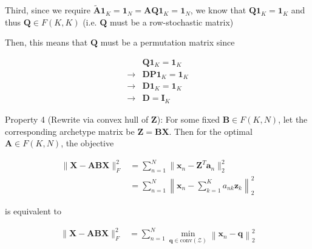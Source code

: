 \documentclass[oneside]{article}
\begin{document}
Third, since we require $\tilde{\mathbf{A}} \mathbf{1}_K = \mathbf{1}_N = \mathbf{A} \mathbf{Q} \mathbf{1}_K = \mathbf{1}_N$, we know that $\mathbf{Q} \mathbf{1}_K = \mathbf{1}_K$ and thus $\mathbf{Q} \in F(K, K)$ (i.e. $\mathbf{Q}$ must be a row-stochastic matrix)

Then, this means that $\mathbf{Q}$ must be a permutation matrix since 

\begin{equation}
    \begin{aligned}
        &\mathbf{Q} \mathbf{1}_K = \mathbf{1}_K \\
        \rightarrow &\mathbf{D} \mathbf{P} \mathbf{1}_K = \mathbf{1}_K \\
        \rightarrow &\mathbf{D} \mathbf{1}_K = \mathbf{1}_K \\
        \rightarrow &\mathbf{D} = \mathbf{I}_K
    \end{aligned}
\end{equation}


Property 4 (Rewrite via convex hull of $\mathbf{Z}$): For some fixed $\mathbf{B} \in F(K, N)$, let the corresponding archetype matrix be $\mathbf{Z} = \mathbf{B} \mathbf{X}$. Then for the optimal $\mathbf{A} \in F(K, N)$, the objective

\begin{equation}
    \begin{aligned}
    \| \mathbf{X} - \mathbf{A} \mathbf{B} \mathbf{X} \|_F^2 
    &= \sum_{n=1}^N \| \mathbf{x}_n - \mathbf{Z}^T \mathbf{a}_n \|_2^2 \\
    &= \sum_{n=1}^N \left\| \mathbf{x}_n - \sum_{k=1}^K a_{nk} \mathbf{z}_k \right\|_2^2
    \end{aligned}
\end{equation}

is equivalent to

\begin{equation}
    \begin{aligned}
    \| \mathbf{X} - \mathbf{A} \mathbf{B} \mathbf{X} \|_F^2 
    &= \sum_{n=1}^N \min_{\mathbf{q} \in \text{conv}(\mathcal{Z})} \left\| \mathbf{x}_n - \mathbf{q} \right\|_2^2
    \end{aligned}
\end{equation}
\end{document}
